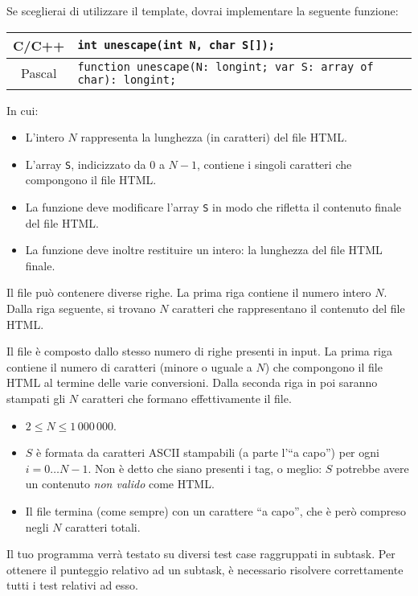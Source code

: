 Se sceglierai di utilizzare il template, dovrai implementare la seguente funzione:
\begin{center}\begin{tabularx}{\textwidth}{|c|X|}
\hline
C/C++  & \verb|int unescape(int N, char S[]);|\\
\hline
Pascal & \verb|function unescape(N: longint; var S: array of char): longint;|\\
\hline
\end{tabularx}\end{center}
In cui:
\begin{itemize}[nolistsep]
  \item L'intero $N$ rappresenta la lunghezza (in caratteri) del file HTML.
  \item L'array \texttt{S}, indicizzato da $0$ a $N-1$, contiene i singoli caratteri che compongono il file HTML.
  \item La funzione deve modificare l'array \texttt{S} in modo che rifletta il contenuto finale del file HTML.
  \item La funzione deve inoltre restituire un intero: la lunghezza del file HTML finale.
\end{itemize}

\InputFile
Il file  può contenere diverse righe. La prima riga contiene il numero intero $N$. Dalla riga seguente, si trovano $N$ caratteri che rappresentano il contenuto del file HTML.

\OutputFile
Il file \outputfile{} è composto dallo stesso numero di righe presenti in input. La prima riga contiene il numero di caratteri (minore o uguale a $N$) che compongono il file HTML al termine delle varie conversioni. Dalla seconda riga in poi saranno stampati gli $N$ caratteri che formano effettivamente il file.

\pagebreak
\Constraints
\begin{itemize}[nolistsep, itemsep=2mm]
	\item $2 \le N \le 1\,000\,000$.
	\item $S$ è formata da caratteri ASCII stampabili (a parte l'``a capo'') per ogni $i=0\ldots N-1$. Non è detto che siano presenti i tag, o meglio: $S$ potrebbe avere un contenuto \emph{non valido} come HTML.
	\item Il file termina (come sempre) con un carattere ``a capo'', che è però compreso negli $N$ caratteri totali.
\end{itemize}

\Scoring
Il tuo programma verrà testato su diversi test case raggruppati in subtask.
Per ottenere il punteggio relativo ad un subtask, è necessario risolvere
correttamente tutti i test relativi ad esso.

